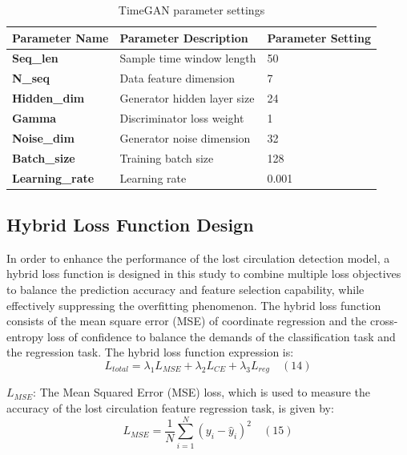 \documentclass[journal,article,submit,pdftex,moreauthors]{Definitions/mdpi}
\begin{document}
\begin{table}[h]
\centering
\begin{tabular}{lll}
\toprule
\textbf{Parameter Name} & \textbf{Parameter Description} & \textbf{Parameter Setting} \\ 
\midrule
\textbf{Seq\_len}       & Sample time window length      & 50                          \\ 
\textbf{N\_seq}         & Data feature dimension         & 7                           \\ 
\textbf{Hidden\_dim}    & Generator hidden layer size    & 24                          \\ 
\textbf{Gamma}          & Discriminator loss weight      & 1                           \\ 
\textbf{Noise\_dim}     & Generator noise dimension      & 32                          \\ 
\textbf{Batch\_size}    & Training batch size            & 128                         \\ 
\textbf{Learning\_rate} & Learning rate                  & 0.001                       \\ 
\bottomrule
\end{tabular}
\caption{TimeGAN parameter settings}
\label{TimeGAN parameter settings}
\end{table}

\subsection{Hybrid Loss Function Design }
 
In order to enhance the performance of the lost circulation detection model, a hybrid loss function is designed in this study to combine multiple loss objectives to balance the prediction accuracy and feature selection capability, while effectively suppressing the overfitting phenomenon. The hybrid loss function consists of the mean square error (MSE) of coordinate regression and the cross-entropy loss of confidence to balance the demands of the classification task and the regression task. The hybrid loss function expression is:
$$ L _ { t o t a l } = \lambda _ { 1 } L _ { M S E } + \lambda _ { 2 } L _ { C E } + \lambda _ { 3 } L _ { r e g }\quad (14)$$

\( L _ { M S E } \): The Mean Squared Error (MSE) loss, which is used to measure the accuracy of the lost circulation feature regression task, is given by:
$$ L _ { M S E } = \frac { 1 } { N } \sum _ { i = 1 } ^ { N } ( y _ { i } - \widehat { y } _ { i } ) ^ { 2 }\quad (15)$$
\end{document}
